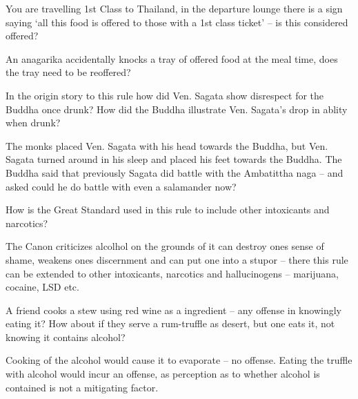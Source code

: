 You are travelling 1st Class to Thailand, in the departure lounge there is a
sign saying ‘all this food is offered to those with a 1st class ticket’ – is
this considered offered?

\bigskip

An anagarika accidentally knocks a tray of offered food at the meal time, does
the tray need to be reoffered?

\bigskip


In the origin story to this rule how did Ven. Sagata show disrespect for the
Buddha once drunk? How did the Buddha illustrate Ven. Sagata’s drop in ablity
when drunk?

\begin{solution}
  The monks placed Ven. Sagata with his head towards the Buddha, but Ven. Sagata
  turned around in his sleep and placed his feet towards the Buddha. The Buddha
  said that previously Sagata did battle with the Ambatittha naga – and asked
  could he do battle with even a salamander now?
\end{solution}

\bigskip

How is the Great Standard used in this rule to include other intoxicants and narcotics?

\begin{solution}
  The Canon criticizes alcolhol on the grounds of it can destroy ones sense of
  shame, weakens ones discernment and can put one into a stupor – there this
  rule can be extended to other intoxicants, narcotics and hallucinogens –
  marijuana, cocaine, LSD etc.
\end{solution}

\bigskip

A friend cooks a stew using red wine as a ingredient – any offense in knowingly
eating it? How about if they serve a rum-truffle as desert, but one eats it, not
knowing it contains alcohol?

\begin{solution}
  Cooking of the alcohol would cause it to evaporate -- no offense. Eating the
  truffle with alcohol would incur an offense, as perception as to whether
  alcohol is contained is not a mitigating factor.
\end{solution}

\bigskip

